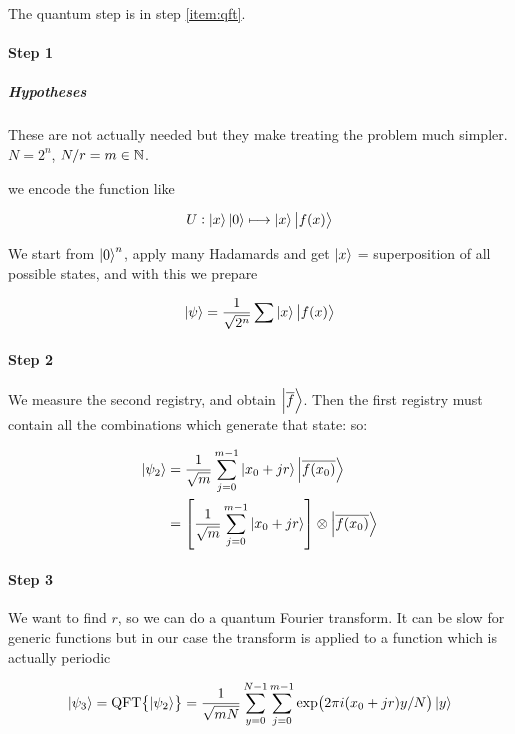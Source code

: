 The quantum step is in step \ref{item:qft}.


\paragraph{Step 1}

\subparagraph{Hypotheses} These are not actually needed but they make treating the problem much simpler. \( N = 2^n \), \( N/r = m \in \mathbb{N} \).

we encode the function like

\begin{equation}
   U: \ket{x}\ket{0} \longmapsto \ket{x} \ket{f(x)}
\end{equation}

We start from \( \ket{0}^n \), apply many Hadamards and get \( \ket{x} \) = superposition of all possible states, and with this
we prepare

\begin{equation}
  \ket{\psi} = \frac{1}{\sqrt{2^n}} \sum \ket{x} \ket{f(x)}
\end{equation}

\paragraph{Step 2}

We measure the second registry, and obtain \( \ket{\overline{f}} \). Then the first registry must contain all the combinations which generate that state: so:

\begin{align}
  \ket{\psi_2}
  &= \frac{1}{\sqrt{m}}\sum _{j=0} ^{m-1} \ket{x_0 + jr} \ket{\overline{f(x_0)}}  \\
  &= \qty[\frac{1}{\sqrt{m}}\sum _{j=0} ^{m-1} \ket{x_0 + jr} ] \otimes \ket{\overline{f(x_0)}}
\end{align}

\paragraph{Step 3}

We want to find \( r \), so we can do a quantum Fourier transform. It can be slow for generic functions but in our case the transform is applied to a function which is actually periodic

\begin{equation}
  \ket{\psi _3} = \text{QFT}\qty{\ket{\psi_2}} = \frac{1}{\sqrt{mN}} \sum _{y=0} ^{N-1} \sum _{j=0} ^{m-1} \exp(2 \pi i (x_0 + jr) y/N) \ket{y}
\end{equation}

